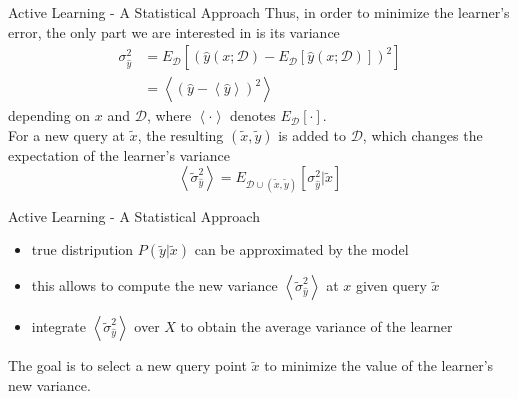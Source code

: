 \documentclass[10pt]{beamer}
\newcommand{\D}{\mathcal{D}}
\newcommand{\ly}{\hat{y}(x;\D)}
\newcommand{\xt}{\tilde{x}}
\newcommand{\yt}{\tilde{y}}
\newcommand{\st}{\tilde{\sigma}}
\newcommand{\E}[1]{\left< #1 \right>}
\begin{document}
\begin{frame}{Active Learning - A Statistical Approach}
Thus, in order to minimize the learner's error, the only part we are interested
in is its variance
\begin{equation}\begin{split}
  \sigma_{\hat{y}}^2
  & = E_{\D} \left[\left(\ly - E_{\D} \left[\ly\right]\right)^2 \right] \\
  & = \left<(\hat{y} - \left<\hat{y}\right> )^2\right>
\end{split}\end{equation}
depending on $x$ and $\D$, where $\left< \cdot \right>$ denotes
$E_\D\left[\cdot\right]$.\\
\vspace{\baselineskip}
For a new query at $\xt$, the resulting $(\xt,\yt)$ is added to $\D$, which
changes the expectation of the learner's variance
\begin{equation}
  \E{\st_{\hat{y}}^2} = E_{\D\cup(\xt,\yt)} \left[\sigma_{\hat{y}}^2 | \xt \right]
\end{equation}
\end{frame}

\begin{frame}{Active Learning - A Statistical Approach}
\begin{itemize}
\item true distripution $P(\yt|\xt)$ can be approximated by the model
\item this allows to compute the new variance $\E{\st_{\hat{y}}^2}$ at $x$
  given query $\xt$
\item integrate $\E{\st_{\hat{y}}^2}$ over $X$ to obtain the average variance
  of the learner
\end{itemize}
\vspace{\baselineskip}
The goal is to select a new query point $\xt$ to minimize the value of the
learner's new variance.
\end{frame}


\end{document}
